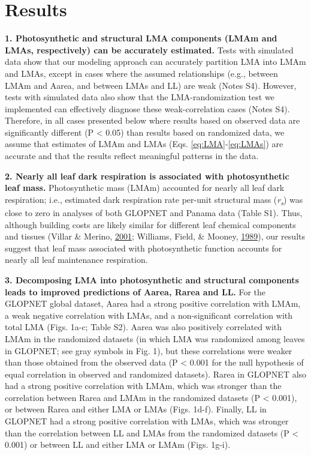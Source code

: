 \documentclass[12pt,]{article}
\theoremstyle{definition}
\theoremstyle{definition}
\theoremstyle{definition}
\theoremstyle{remark}
\begin{document}
\hypertarget{results}{%
\section{Results}\label{results}}

\textbf{1. Photosynthetic and structural LMA components (LMAm and LMAs,
respectively) can be accurately estimated.} Tests with simulated data
show that our modeling approach can accurately partition LMA into LMAm
and LMAs, except in cases where the assumed relationships (e.g., between
LMAm and Aarea, and between LMAs and LL) are weak (Notes S4). However,
tests with simulated data also show that the LMA-randomization test we
implemented can effectively diagnose these weak-correlation cases (Notes
S4). Therefore, in all cases presented below where results based on
observed data are significantly different (P \textless{} 0.05) than
results based on randomized data, we assume that estimates of LMAm and
LMAs (Eqs. \eqref{eq:LMA}-\eqref{eq:LMAs}) are accurate and that the results
reflect meaningful patterns in the data.

\textbf{2. Nearly all leaf dark respiration is associated with
photosynthetic leaf mass.} Photosynthetic mass (LMAm) accounted for
nearly all leaf dark respiration; i.e., estimated dark respiration rate
per-unit structural mass (\emph{r\textsubscript{s}}) was close to zero
in analyses of both GLOPNET and Panama data (Table S1). Thus, although
building costs are likely similar for different leaf chemical components
and tissues (Villar \& Merino, \protect\hyperlink{ref-Villar2001}{2001};
Williams, Field, \& Mooney, \protect\hyperlink{ref-Williams1989}{1989}),
our results suggest that leaf mass associated with photosynthetic
function accounts for nearly all leaf maintenance respiration.

\textbf{3. Decomposing LMA into photosynthetic and structural components
leads to improved predictions of Aarea, Rarea and LL.} For the GLOPNET
global dataset, Aarea had a strong positive correlation with LMAm, a
weak negative correlation with LMAs, and a non-significant correlation
with total LMA (Figs. 1a-c; Table S2). Aarea was also positively
correlated with LMAm in the randomized datasets (in which LMA was
randomized among leaves in GLOPNET; see gray symbols in Fig. 1), but
these correlations were weaker than those obtained from the observed
data (P \textless{} 0.001 for the null hypothesis of equal correlation
in observed and randomized datasets). Rarea in GLOPNET also had a strong
positive correlation with LMAm, which was stronger than the correlation
between Rarea and LMAm in the randomized datasets (P \textless{} 0.001),
or between Rarea and either LMA or LMAs (Figs. 1d-f). Finally, LL in
GLOPNET had a strong positive correlation with LMAs, which was stronger
than the correlation between LL and LMAs from the randomized datasets (P
\textless{} 0.001) or between LL and either LMA or LMAm (Figs. 1g-i).
\end{document}
